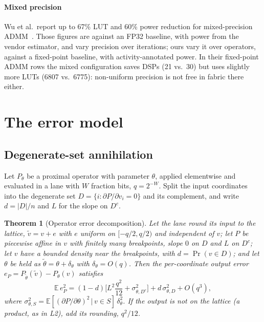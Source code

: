 \documentclass[conference]{IEEEtran}
\newtheorem{theorem}{Theorem}
\begin{document}
\paragraph{Mixed precision} Wu et al.\ report up to 67\% LUT and 60\% power
reduction for mixed-precision ADMM~\cite{wu2022mixed}. Those figures are
against an FP32 baseline, with power from the vendor estimator, and vary
precision over iterations; ours vary it over operators, against a fixed-point
baseline, with activity-annotated power. In their fixed-point ADMM rows the
mixed configuration saves DSPs (21 vs.\ 30) but uses slightly more LUTs (6807
vs.\ 6775): non-uniform precision is not free in fabric there either.

\section{The error model}
\label{sec:model}

\subsection{Degenerate-set annihilation}

Let $P_\theta$ be a proximal operator with parameter $\theta$, applied
elementwise and evaluated in a lane with $W$ fraction bits, $q=2^{-W}$. Split
the input coordinates into the degenerate set $D=\{i:\partial P/\partial v_i=0\}$
and its complement, and write $d=|D|/n$ and $L$ for the slope on $D^c$.

\begin{theorem}[Operator error decomposition]\label{thm:t1}
Let the lane round its input to the lattice, $\tilde v=v+e$ with $e$ uniform on
$[-q/2,q/2)$ and independent of $v$; let $P$ be piecewise affine in $v$ with
finitely many breakpoints, slope $0$ on $D$ and $L$ on $D^c$; let $v$ have a
bounded density near the breakpoints, with $d=\Pr(v\in D)$; and let $\theta$ be
held as $\tilde\theta=\theta+\delta_\theta$ with $\delta_\theta=O(q)$. Then the per-coordinate output error
$e_P=P_{\tilde\theta}(\tilde v)-P_\theta(v)$ satisfies
\begin{equation}
\mathbb{E}\,e_P^2=(1-d)\Big[L^2\frac{q^2}{12}+\sigma^2_{\theta,D^c}\Big]
+d\,\sigma^2_{\theta,D}+O(q^3),
\label{eq:t1}
\end{equation}
where $\sigma^2_{\theta,S}=\mathbb{E}[(\partial P/\partial\theta)^2\,|\,v\in S]\,\delta_\theta^2$.
If the output is not on the lattice (a product, as in L2), add its rounding,
$q^2/12$.
\end{theorem}
\end{document}
